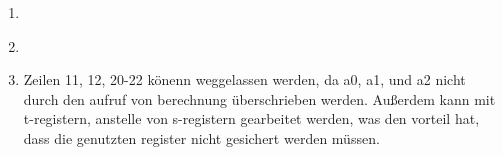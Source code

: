 

\usepackage{tikz}
\usetikzlibrary{arrows,automata}   

\date{Donnerstag 28.05.2020}


    \maketitle
    \thispagestyle{fancy}

    \begin{enumerate}
        \item \hfill \\ 
        \pagebreak
        \item \hfill \\ 
        \item Zeilen 11, 12, 20-22 könenn weggelassen werden, da a0, a1, und a2 nicht durch den aufruf von berechnung überschrieben werden. Außerdem kann mit t-registern, anstelle von s-registern gearbeitet werden, was den vorteil hat, dass die genutzten register nicht gesichert werden müssen.
    \end{enumerate}




